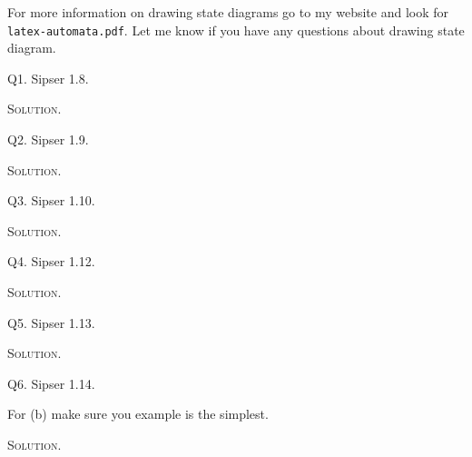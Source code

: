 For more information on drawing state diagrams go to my website
and look for \verb!latex-automata.pdf!.
Let me know if you have any questions about drawing state diagram.

\newpage
Q1. Sipser 1.8.

\textsc{Solution}.



\newpage
Q2. Sipser 1.9.

\textsc{Solution}.



\newpage
Q3. Sipser 1.10.

\textsc{Solution}.



\newpage
Q4. Sipser 1.12.

\textsc{Solution}.



\newpage
Q5. Sipser 1.13.

\textsc{Solution}.




\newpage
Q6. Sipser 1.14.

For (b) make sure you example is the simplest.

\textsc{Solution}.




